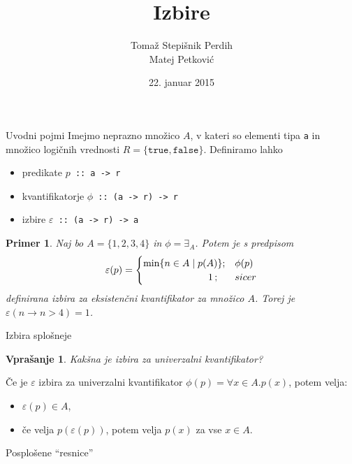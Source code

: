 \documentclass{beamer}
\author[Sintaktična sladkorčka]{Tomaž Stepišnik Perdih\\  Matej Petković}
\title{Izbire}
\date{{22. januar 2015}}
\newtheorem{dok}{Vprašanje}
\newtheorem{prim}{Primer}
\def\eps{\varepsilon}
\begin{document}
\begin{frame}
\titlepage 
\end{frame}

\begin{frame}{Uvodni pojmi}
Imejmo neprazno množico $A$, v kateri so elementi tipa \texttt{a}  in množico logičnih vrednosti $R =  \{ \texttt{true}, \texttt{false}\} $. Definiramo lahko
\begin{itemize}
\item predikate\; $p$\texttt{ :: a -> r}
\item kvantifikatorje\; $\phi$\texttt{ :: (a -> r) -> r}
\item izbire $\varepsilon$\texttt{ :: (a -> r) -> a}
\end{itemize}

\pause

\begin{prim}
Naj bo $A = \{1,2,3,4\}$ in $\phi = \exists_A$. Potem je s predpisom
$$\eps (p) =
\begin{cases}
\min \{ n \in A \mid p(A) \} ;& \phi(p)\\
\hphantom{oooooooooioooo}1\, ;& sicer
\end{cases}
$$
definirana izbira za eksistenčni kvantifikator za množico $A$. Torej je $\eps (n \to n > 4) = 1$.
\end{prim}

\end{frame}

\begin{frame}[fragile]{Izbira splošneje}%

\begin{dok}
Kakšna je izbira za univerzalni kvantifikator?
\end{dok}

\pause

Če je $\eps$ izbira za univerzalni kvantifikator $\phi(p) = \forall x \in A . p(x)$, potem velja:
\begin{itemize}
\item $\eps(p) \in A$,
\item če velja $p(\eps(p))$, potem velja $p(x)$ za vse $x \in A$.
\end{itemize}


\end{frame}

\begin{frame}{Posplošene "`resnice"'}


\end{frame}
\end{document}
